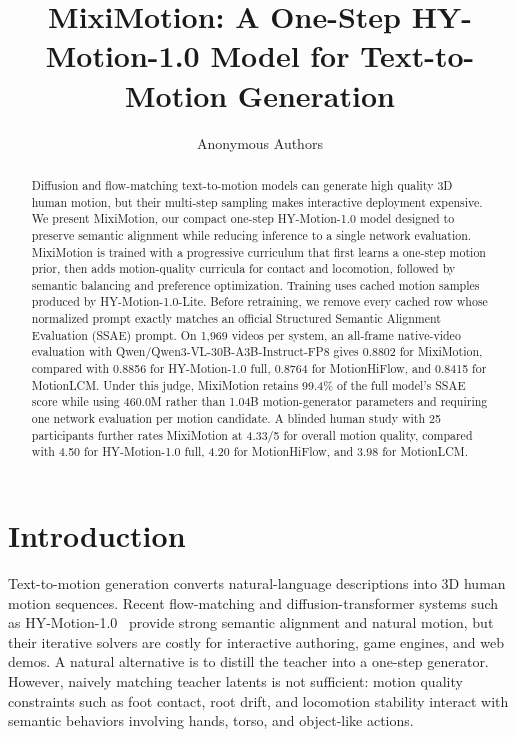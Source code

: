 \documentclass[runningheads]{llncs}
\begin{document}
\title{MixiMotion: A One-Step HY-Motion-1.0 Model for Text-to-Motion Generation}

\author{Anonymous Authors}

\maketitle

\begin{abstract}
Diffusion and flow-matching text-to-motion models can generate high quality
3D human motion, but their multi-step sampling makes interactive deployment
expensive. We present MixiMotion, our compact one-step HY-Motion-1.0 model
designed to preserve semantic alignment while reducing inference to a single
network evaluation. MixiMotion is trained with a
progressive curriculum that first learns a one-step motion prior, then adds
motion-quality curricula for contact and locomotion, followed by semantic
balancing and preference optimization. Training uses cached motion samples
produced by HY-Motion-1.0-Lite. Before retraining, we remove every cached row
whose normalized prompt exactly matches an official Structured Semantic
Alignment Evaluation (SSAE) prompt. On 1,969 videos per system, an all-frame
native-video evaluation with Qwen/Qwen3-VL-30B-A3B-Instruct-FP8 gives 0.8802
for MixiMotion, compared with 0.8856 for HY-Motion-1.0 full, 0.8764 for
MotionHiFlow, and 0.8415 for MotionLCM. Under this judge, MixiMotion retains
99.4\% of the full model's SSAE score while using 460.0M rather than 1.04B
motion-generator parameters and requiring one network evaluation per motion
candidate. A blinded human study with 25 participants further rates
MixiMotion at 4.33/5 for overall motion quality, compared with 4.50 for
HY-Motion-1.0 full, 4.20 for MotionHiFlow, and 3.98 for MotionLCM.

\end{abstract}

\section{Introduction}

Text-to-motion generation converts natural-language descriptions into 3D human
motion sequences. Recent flow-matching and diffusion-transformer systems such
as HY-Motion-1.0~\cite{hymotion2025} provide strong semantic alignment and natural
motion, but their iterative solvers are costly for interactive authoring,
game engines, and web demos. A natural alternative is to distill the teacher
into a one-step generator. However, naively matching teacher latents is not
sufficient: motion quality constraints such as foot contact, root drift, and
locomotion stability interact with semantic behaviors involving hands, torso,
and object-like actions.
\end{document}
